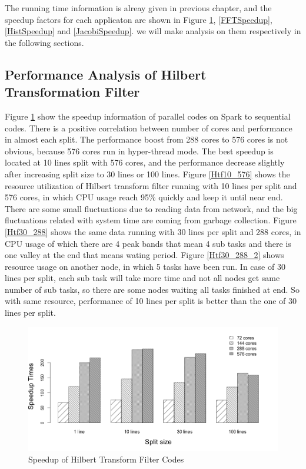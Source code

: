 The running time information is alreay given in previous chapter, and the speedup factors for each applicaton are shown in Figure \ref{HtfSpeedup}, \ref{FFTSpeedup}, \ref{HistSpeedup} and \ref{JacobiSpeedup}. we will make analysis on them respectively in the following sections. 

\subsection{Performance Analysis of Hilbert Transformation Filter}
Figure \ref{HtfSpeedup} show the speedup information of parallel codes on Spark to sequential codes. There is a positive correlation between number of cores and performance in almost each split. The performance boost from 288 cores to 576 cores is not obvious, because 576 cores run in hyper-thread mode. The best speedup is located at 10 lines split with 576 cores, and the performance decrease slightly after increasing split size to 30 lines or 100 lines. Figure \ref{Htf10_576} shows the resource utilization of Hilbert transform filter running with 10 lines per split and 576 cores, in which CPU usage reach 95\% quickly and keep it until near end. There are some small fluctuations due to reading data from network, and the big fluctuations related with system time are coming from garbage collection. Figure \ref{Htf30_288} shows the same data running with 30 lines per split and 288 cores, in CPU usage of which there are 4 peak bands that mean 4 sub tasks and there is one valley at the end that means wating period. Figure \ref{Htf30_288_2} shows resource usage on another node, in which 5 tasks have been run. In case of 30 lines per split, each sub task will take more time and not all nodes get same number of sub tasks, so there are some nodes waiting all tasks finished at end. So with same resource, performance of 10 lines per split is better than the one of 30 lines per split. 

\begin{figure}[h]
\centering
\includegraphics[scale=.50]{figures/HtfSpeedup.png}
\caption{Speedup of Hilbert Transform Filter Codes}
\label{HtfSpeedup}
\end{figure}


